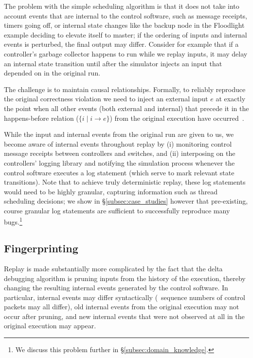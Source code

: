 The problem with the simple scheduling algorithm is that it does not take into
account events that are internal to the control software, such as
message receipts, timers going off, or internal state
changes like the backup node in the Floodlight example deciding to elevate
itself to master; if the ordering of inputs and internal events is
perturbed, the final output may differ.
Consider for example that if a controller's garbage collector happens to run
while we replay inputs, it may delay an internal state transition until
after the simulator injects an input that depended on in the original run.

The challenge is to maintain causal relationships.
Formally, to reliably reproduce the original correctness violation
we need to
inject an external input $e$ at exactly the point when all other
events (both external and internal) that precede it in the happens-before
relation ($\{i \mid i \rightarrow e\}$) from the original execution have
occurred~\cite{tel2000introduction}.

While the input and internal events from the original run are given to us,
we become aware of internal events throughout replay by
(i) monitoring
control message receipts between controllers and switches,
and (ii) interposing on the controllers' logging library and notifying the
simulation process whenever the control software executes a log statement (which serve to mark relevant state
transitions). Note that to achieve truly deterministic
replay, these log statements would need to
be highly granular, capturing information such as thread scheduling decisions;
we show in \S\ref{subsec:case_studies}
however that pre-existing, course granular log statements are sufficient to
successfully reproduce \num{many} bugs.\footnote{We discuss this problem further in
\S\ref{subsec:domain_knowledge}.}

\subsection{Fingerprinting}
\label{subsec:fingerprinting}

Replay is made substantially more complicated by the fact
that the delta debugging algorithm is pruning inputs from the history of the
execution, thereby changing the resulting internal events generated by the control
software. In particular, internal events may differ syntactically (\eg~sequence numbers
of control packets may all differ), old internal events from the original
execution may not occur after pruning, and new internal events that were not
observed at all in the original execution may appear.

